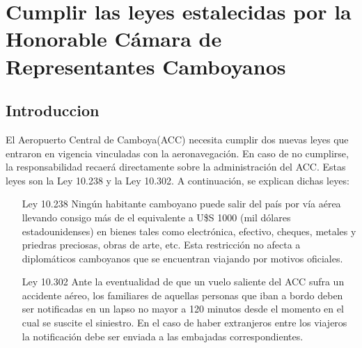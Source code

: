 \section{Cumplir las leyes estalecidas por la Honorable Cámara de Representantes Camboyanos}
\subsection{Introduccion}
El Aeropuerto Central de Camboya(ACC) necesita cumplir dos nuevas leyes que entraron en 
vigencia vinculadas con la aeronavegación. En caso de no cumplirse, la responsabilidad 
recaerá directamente sobre la administración del ACC.
Estas leyes son la Ley 10.238 y la Ley 10.302.
A continuación, se explican dichas leyes:
\begin{enumerate}
 \item[Ley 10.238] Ningún habitante camboyano puede salir del país por vía aérea llevando consigo
más de el equivalente a U\$S 1000 (mil dólares estadounidenses) en bienes tales como electrónica,
efectivo, cheques, metales y priedras preciosas, obras de arte, etc. Esta restricción no afecta
a diplomáticos camboyanos que se encuentran viajando por motivos oficiales.
 \item[Ley 10.302] Ante la eventualidad de que un vuelo saliente del ACC sufra un accidente aéreo, los 
familiares de aquellas personas que iban a bordo deben ser notificadas en un lapso no mayor a 
120 minutos desde el momento en el cual se suscite el siniestro. En el caso de haber extranjeros 
entre los viajeros la notificación debe ser enviada a las embajadas correspondientes.
\end{enumerate}

